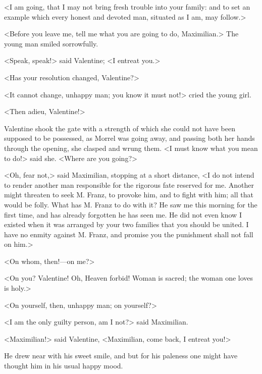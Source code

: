  <I am going, that I may not bring fresh trouble into your family: and to set an example which every honest and devoted man, situated as I am, may follow.> 

 <Before you leave me, tell me what you are going to do, Maximilian.> The young man smiled sorrowfully. 

 <Speak, speak!> said Valentine; <I entreat you.> 

 <Has your resolution changed, Valentine?> 

 <It cannot change, unhappy man; you know it must not!> cried the young girl. 

 <Then adieu, Valentine!> 

 Valentine shook the gate with a strength of which she could not have been supposed to be possessed, as Morrel was going away, and passing both her hands through the opening, she clasped and wrung them. <I must know what you mean to do!> said she. <Where are you going?> 

 <Oh, fear not,> said Maximilian, stopping at a short distance, <I do not intend to render another man responsible for the rigorous fate reserved for me. Another might threaten to seek M. Franz, to provoke him, and to fight with him; all that would be folly. What has M. Franz to do with it? He saw me this morning for the first time, and has already forgotten he has seen me. He did not even know I existed when it was arranged by your two families that you should be united. I have no enmity against M. Franz, and promise you the punishment shall not fall on him.> 

 <On whom, then!—on me?> 

 <On you? Valentine! Oh, Heaven forbid! Woman is sacred; the woman one loves is holy.> 

 <On yourself, then, unhappy man; on yourself?> 

 <I am the only guilty person, am I not?> said Maximilian. 

 <Maximilian!> said Valentine, <Maximilian, come back, I entreat you!> 

 He drew near with his sweet smile, and but for his paleness one might have thought him in his usual happy mood. 


